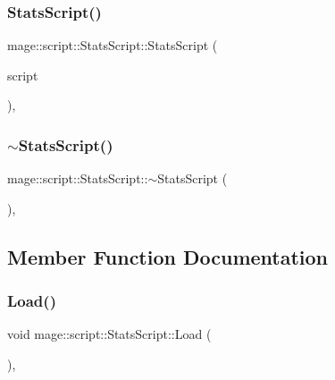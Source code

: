 \subsubsection{\texorpdfstring{Stats\+Script()}{StatsScript()}\hspace{0.1cm}{\footnotesize\ttfamily [3/3]}}
{\footnotesize\ttfamily mage\+::script\+::\+Stats\+Script\+::\+Stats\+Script (\begin{DoxyParamCaption}\item[{\hyperlink{classmage_1_1script_1_1_stats_script}{Stats\+Script} \&\&}]{script }\end{DoxyParamCaption})\hspace{0.3cm}{\ttfamily [default]}, {\ttfamily [noexcept]}}

\hypertarget{classmage_1_1script_1_1_stats_script_a5b9b30aa6939968c2aee8cdf11f6486c}{}\label{classmage_1_1script_1_1_stats_script_a5b9b30aa6939968c2aee8cdf11f6486c} 
\subsubsection{\texorpdfstring{$\sim$\+Stats\+Script()}{~StatsScript()}}
{\footnotesize\ttfamily mage\+::script\+::\+Stats\+Script\+::$\sim$\+Stats\+Script (\begin{DoxyParamCaption}{ }\end{DoxyParamCaption})\hspace{0.3cm}{\ttfamily [virtual]}, {\ttfamily [default]}}



\subsection{Member Function Documentation}
\hypertarget{classmage_1_1script_1_1_stats_script_aae0d11d30f1242d1f8d569b5b0894343}{}\label{classmage_1_1script_1_1_stats_script_aae0d11d30f1242d1f8d569b5b0894343} 
\subsubsection{\texorpdfstring{Load()}{Load()}}
{\footnotesize\ttfamily void mage\+::script\+::\+Stats\+Script\+::\+Load (\begin{DoxyParamCaption}{ }\end{DoxyParamCaption})\hspace{0.3cm}{\ttfamily [override]}, {\ttfamily [virtual]}}

